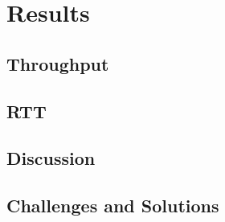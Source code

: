 \chapter{Results}

\section{Throughput}

\section{RTT}

\section{Discussion}

\section{Challenges and Solutions}